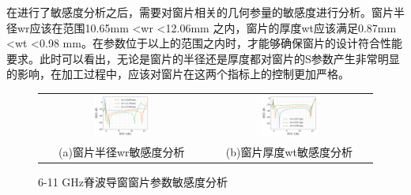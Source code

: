 \documentclass[master]{thesis-uestc}
\begin{document}
在进行了敏感度分析之后，需要对窗片相关的几何参量的敏感度进行分析。窗片半径wr应该在范围10.65mm <wr <12.06mm 之内，窗片的厚度wt应该满足0.87mm <wt <0.98 mm。在参数位于以上的范围之内时，才能够确保窗片的设计符合性能要求。此时可以看出，无论是窗片的半径还是厚度都对窗片的S参数产生非常明显的影响，在加工过程中，应该对窗片在这两个指标上的控制更加严格。
\begin{figure}[!htb]
    \small
    \centering
    \begin{tabular}{@{\ }c@{\ }c}
        \includegraphics[width=0.35\textwidth]{pic/chapter3/窗片半径wr扫参.png} & 
        \hspace{5pt}
        \includegraphics[width=0.35\textwidth]{pic/chapter3/窗片厚度wt扫参.png}     \\
        \mbox{\small (a)窗片半径wr敏感度分析}                                                                               & 
        \mbox{\small (b)窗片厚度wt敏感度分析}                                                                                  \\
    \end{tabular}
    \caption{6-11 GHz脊波导窗窗片参数敏感度分析}
    \label{fig:X频段脊波导窗窗片参数敏感度分析}
\end{figure}
\end{document}
